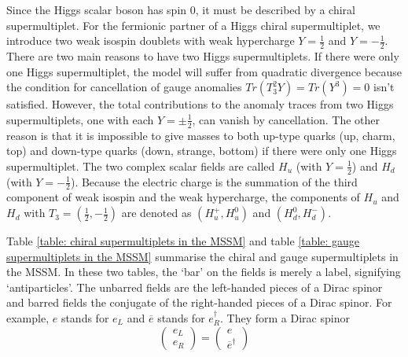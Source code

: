 \documentclass[12pt]{report}
\begin{document}
Since the Higgs scalar boson has spin $0$, it must be described by a chiral supermultiplet.
For the fermionic partner of a Higgs chiral supermultiplet, we introduce two weak isospin doublets with weak hypercharge $Y = \frac{1}{2}$ and $Y = -\frac{1}{2}$.
There are two main reasons to have two Higgs supermultiplets.
If there were only one Higgs supermultiplet, the model will suffer from quadratic divergence because the condition for cancellation of gauge anomalies $Tr(T^{2}_{3} Y) = Tr(Y^{3}) = 0$ isn't satisfied.
However, the total contributions to the anomaly traces from two Higgs supermultiplets, one with each $Y = \pm \frac{1}{2}$, can vanish by cancellation.
The other reason is that it is impossible to give masses to both up-type quarks (up, charm, top) and down-type quarks (down, strange, bottom) if there were only one Higgs supermultiplet.
The two complex scalar fields are called $H_{u}$ (with $Y = \frac{1}{2}$) and $H_{d}$ (with $Y = -\frac{1}{2}$).
Because the electric charge is the summation of the third component of weak isospin and the weak hypercharge, the components of $H_{u}$ and $H_{d}$ with $T_{3} = (\frac{1}{2}, -\frac{1}{2})$ are denoted as $(H^{+}_{u}, H^{0}_{u})$ and $(H^{0}_{d}, H^{-}_{d})$.

Table \ref{table: chiral supermultiplets in the MSSM} and table \ref{table: gauge supermultiplets in the MSSM} summarise the chiral and gauge supermultiplets in the MSSM.
In these two tables, the `bar' on the fields is merely a label, signifying `antiparticles'.%
The unbarred fields are the left-handed pieces of a Dirac spinor and barred fields the conjugate of the right-handed pieces of a Dirac spinor.
For example, $e$ stands for $e_{L}$ and $\overline{e}$ stands for $e^{\dag}_{R}$.
They form a Dirac spinor
\begin{equation}
\left( \begin{array}{c} e_{L}\\ {e}_{R} \end{array} \right) = \left( \begin{array}{c} e\\ \overline{e}^{\dag} \end{array} \right)
\end{equation}
\end{document}
